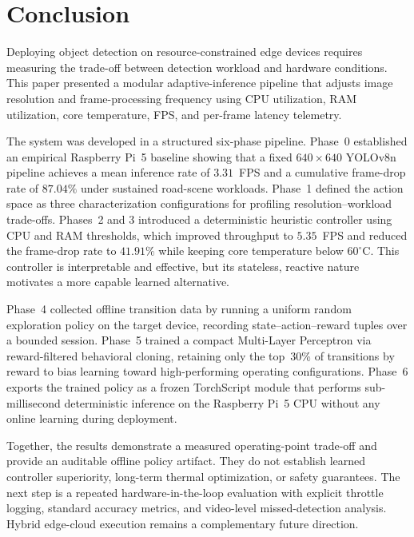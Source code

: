 \documentclass{ieeeaccess}
\begin{document}
\section{Conclusion}
\label{sec:conclusion}
Deploying object detection on resource-constrained edge devices requires
measuring the trade-off between detection workload and hardware conditions.
This paper presented a modular adaptive-inference pipeline that adjusts image
resolution and frame-processing frequency using CPU utilization, RAM
utilization, core temperature, FPS, and per-frame latency telemetry.

The system was developed in a structured six-phase pipeline. Phase~0
established an empirical Raspberry Pi~5 baseline showing that a fixed
$640\times640$ YOLOv8n pipeline achieves a mean inference rate of
$3.31$~FPS and a cumulative frame-drop rate of $87.04\%$ under sustained
road-scene workloads. Phase~1 defined the action space as three
characterization configurations for profiling resolution--workload trade-offs.
Phases~2 and 3 introduced a deterministic heuristic controller using
CPU and RAM thresholds, which improved throughput to $5.35$~FPS and reduced
the frame-drop rate to $41.91\%$ while keeping core temperature below
$60^\circ$C. This controller is interpretable and effective, but its
stateless, reactive nature motivates a more capable learned alternative.

Phase~4 collected offline transition data by running a uniform random
exploration policy on the target device, recording state--action--reward
tuples over a bounded session. Phase~5 trained a compact
Multi-Layer Perceptron via reward-filtered behavioral cloning, retaining
only the top~30\% of transitions by reward to bias learning toward
high-performing operating configurations. Phase~6 exports the trained
policy as a frozen TorchScript module that performs sub-millisecond
deterministic inference on the Raspberry Pi~5 CPU without any online
learning during deployment.

Together, the results demonstrate a measured operating-point trade-off and
provide an auditable offline policy artifact. They do not establish learned
controller superiority, long-term thermal optimization, or safety guarantees.
The next step is a repeated hardware-in-the-loop evaluation with explicit
throttle logging, standard accuracy metrics, and video-level missed-detection
analysis. Hybrid edge-cloud execution remains a complementary future
direction.
\end{document}

